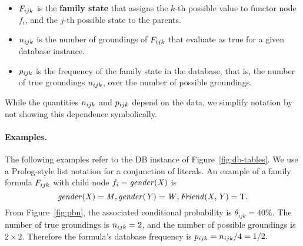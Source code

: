 \documentclass{article}
\begin{document}
\begin{itemize}
\item$F_{ijk}$ is the \textbf{family state} that assigns the $k$-th possible value to functor node $f_{i}$, and the $j$-th possible state to the parents.
\item $n_{ijk}$
is the number of groundings of $F_{ijk}$ that evaluate as true for a given database instance.
\item $p_{ijk}$
is the frequency of the family state in the database, that is, the number of true groundings $n_{ijk}$, over the number of possible groundings.
\end{itemize}
%


While the quantities $n_{ijk}$ and $p_{ijk}$ depend on the data, we simplify notation by not showing this dependence symbolically.

\paragraph{Examples.} The following examples refer to the DB instance of Figure~\ref{fig:db-tables}.
We use a Prolog-style list notation for a conjunction of literals. 
An example of a family formula $F_{ijk}$  with child node $f_{i}=\it{gender}(X)$ is 
\[ \it{gender}(X)= M,\it{gender}(Y) = W,\it{Friend}(X,Y) = \mathrm{T}.\] 
From Figure~\ref{fig:pbn}, the associated conditional probability is $\theta_{ijk}= 40\%$.
The number of true groundings is $n_{ijk} = 2$, and the number of possible groundings is  $2 \times 2$. Therefore the formula's database frequency  is $p_{ijk} = n_{ijk}/{4}= 1/2.$
\end{document}
